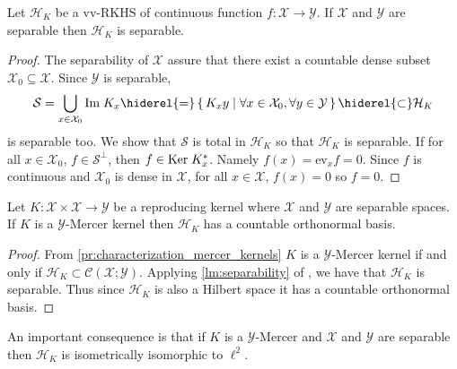 \begin{lemma}
\label{lm:separability}
Let $\mathcal{H}_K$ be a \acl{vv-RKHS} of continuous function $f:\mathcal{X}\to\mathcal{Y}$. If $\mathcal{X}$ and $\mathcal{Y}$ are separable then $\mathcal{H}_K$ is separable.
\end{lemma}
\begin{proof}
The separability of $\mathcal{X}$ assure that there exist a countable dense subset $\mathcal{X}_0\subseteq\mathcal{X}$. Since $\mathcal{Y}$ is separable,
\begin{dmath*}
\mathcal{S}=\bigcup_{x\in\mathcal{X}_0}\Ima K_x \hiderel{=}\set{K_xy|\forall x\in\mathcal{X}_0, \forall y\in\mathcal{Y}}\hiderel{\subset} \mathcal{H}_K
\end{dmath*}
is separable too. We show that $\mathcal{S}$ is total in $\mathcal{H}_K$ so that $\mathcal{H}_K$ is separable. If for all $x\in\mathcal{X}_0$, $f\in\mathcal{S}^{\bot}$, then $f\in\text{Ker}\; K_x^*$. Namely $f(x)=\text{ev}_xf=0$. Since $f$ is continuous and $\mathcal{X}_0$ is dense in $\mathcal{X}$, for all $x\in\mathcal{X}$, $f(x)=0$ so $f=0$.
\end{proof}

\begin{proposition}
\label{pr:mercer_countable_basis}
Let $K:\mathcal{X}\times\mathcal{X}\to\mathcal{Y}$ be a reproducing kernel where $\mathcal{X}$ and $\mathcal{Y}$ are separable spaces. If $K$ is a $\mathcal{Y}$-Mercer kernel then $\mathcal{H}_K$ has a countable orthonormal basis.
\end{proposition}
\begin{proof}
From \cref{pr:characterization_mercer_kernels} $K$ is a $\mathcal{Y}$-Mercer kernel if and only if $\mathcal{H}_K\subset \mathcal{C}(\mathcal{X};\mathcal{Y})$. Applying \cref{lm:separability} of \cite{carmeli2006vector}, we have that $\mathcal{H}_K$ is separable. Thus since $\mathcal{H}_K$ is also a Hilbert space it has a countable orthonormal basis.
\end{proof}
An important consequence is that if $K$ is a $\mathcal{Y}$-Mercer and $\mathcal{X}$ and $\mathcal{Y}$ are separable then $\mathcal{H}_K$ is isometrically isomorphic to $\ell^2$.

